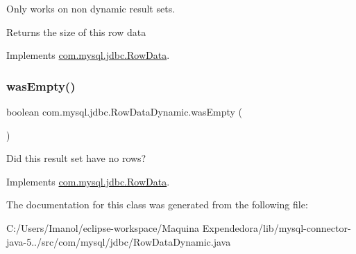 Only works on non dynamic result sets.

\begin{DoxyReturn}{Returns}
the size of this row data 
\end{DoxyReturn}


Implements \mbox{\hyperlink{interfacecom_1_1mysql_1_1jdbc_1_1_row_data_a7c6f91ddc0fcd7f5f12a64c7dc019995}{com.\+mysql.\+jdbc.\+Row\+Data}}.

\mbox{\label{classcom_1_1mysql_1_1jdbc_1_1_row_data_dynamic_a40a524d57dd4356ce8ec38796ae68e38}} 
\subsubsection{\texorpdfstring{was\+Empty()}{wasEmpty()}}
{\footnotesize\ttfamily boolean com.\+mysql.\+jdbc.\+Row\+Data\+Dynamic.\+was\+Empty (\begin{DoxyParamCaption}{ }\end{DoxyParamCaption})}

Did this result set have no rows? 

Implements \mbox{\hyperlink{interfacecom_1_1mysql_1_1jdbc_1_1_row_data_a27df2f8d51aad5e69a5ac330a7b70aac}{com.\+mysql.\+jdbc.\+Row\+Data}}.



The documentation for this class was generated from the following file\+:\begin{DoxyCompactItemize}
\item 
C\+:/\+Users/\+Imanol/eclipse-\/workspace/\+Maquina Expendedora/lib/mysql-\/connector-\/java-\/5../src/com/mysql/jdbc/Row\+Data\+Dynamic.\+java\end{DoxyCompactItemize}

